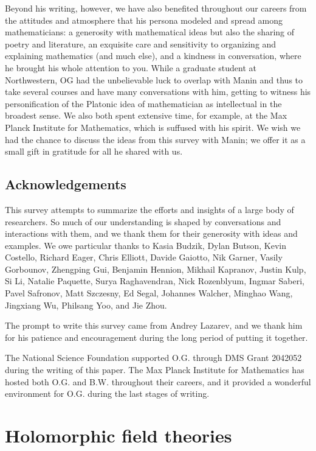 \documentclass[11pt]{amsart}
\begin{document}
Beyond his writing, however, we have also benefited throughout our careers from the attitudes and atmosphere that his persona modeled and spread among mathematicians:
a generosity with mathematical ideas but also the sharing of poetry and literature, 
an exquisite care and sensitivity to organizing and explaining mathematics (and much else),
and a kindness in conversation, where he brought his whole attention to you.
While a graduate student at Northwestern, 
OG had the unbelievable luck to overlap with Manin and thus to take several courses and have many conversations with him, 
getting to witness his personification of the Platonic idea of mathematician as intellectual in the broadest sense.
We also both spent extensive time, for example, at the Max Planck Institute for Mathematics,
which is suffused with his spirit.
We wish we had the chance to discuss the ideas from this survey with Manin;
we offer it as a small gift in gratitude for all he shared with us.


\subsection{Acknowledgements}

This survey attempts to summarize the efforts and insights of a large body of researchers.
So much of our understanding is shaped by conversations and interactions with them,
and we thank them for their generosity with ideas and examples.
We owe particular thanks to Kasia Budzik, Dylan Butson, Kevin Costello, Richard Eager, Chris Elliott, Davide Gaiotto, Nik Garner, Vasily Gorbounov, Zhengping Gui, Benjamin Hennion, Mikhail Kapranov, Justin Kulp, Si Li,  Natalie Paquette, Surya Raghavendran, Nick Rozenblyum,  Ingmar Saberi,  Pavel Safronov,  Matt Szczesny, Ed Segal,  Johannes Walcher, Minghao Wang, Jingxiang Wu, Philsang Yoo, and Jie Zhou.

The prompt to write this survey came from Andrey Lazarev, and we thank him for his patience and encouragement during the long period of putting it together.

The National Science Foundation supported O.G. through DMS Grant 2042052 during the writing of this paper.
The Max Planck Institute for Mathematics has hosted both O.G. and B.W. throughout their careers, and it provided a wonderful environment for O.G. during the last stages of writing.

\section{Holomorphic field theories}
\label{sec: HFT}
\end{document}
